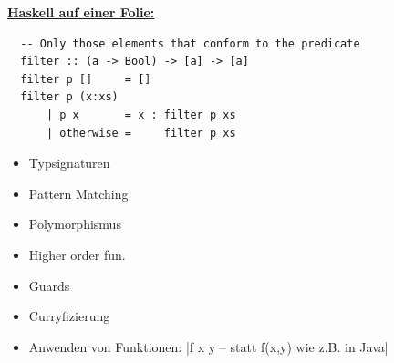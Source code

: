 \documentclass[unknownkeysallowed]{beamer}
\begin{document}
  
  \begin{frame}[fragile]
  
  \Large\textbf{\underline{Haskell auf einer Folie:}} \bigskip \normalsize

  \begin{verbatim}
  -- Only those elements that conform to the predicate
  filter :: (a -> Bool) -> [a] -> [a]
  filter p []     = []
  filter p (x:xs) 
      | p x       = x : filter p xs
      | otherwise =     filter p xs
  \end{verbatim}
  
  \pause
  
  \begin{multicols}{2}
  \begin{itemize}
  \item Typsignaturen    \pause
  \item Pattern Matching \pause
  \item Polymorphismus   \pause
  \end{itemize}
  
  \columnbreak
  
  \begin{itemize}
  \item Higher order fun. \pause
  \item Guards            \pause
  \item Curryfizierung    \pause
  \end{itemize}

  \end{multicols}

  \begin{itemize}
  \item Anwenden von Funktionen: |f x y -- statt f(x,y) wie z.B. in Java| 
  \end{itemize}
  
\end{frame}

\end{document}
